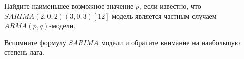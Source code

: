 
\begin{question}
Найдите наименьшее возможное значение \(p\), если известно, что \(SARIMA(2, 0, 2)(3, 0, 3)[12]\)-модель является частным случаем \(ARMA(p, q)\)-модели.
\end{question}

\begin{solution}
Вспомните формулу \(SARIMA\) модели и обратите внимание на наибольшую степень лага.
\end{solution}

